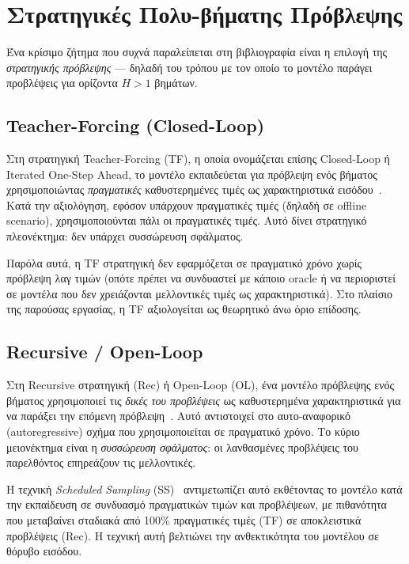 \section{Στρατηγικές Πολυ-βήματης Πρόβλεψης}
\label{sec:forecasting_strategies}

Ένα κρίσιμο ζήτημα που συχνά παραλείπεται στη βιβλιογραφία είναι η επιλογή της \textit{στρατηγικής
πρόβλεψης} --- δηλαδή του τρόπου με τον οποίο το μοντέλο παράγει προβλέψεις για ορίζοντα $H > 1$
βημάτων.

\subsection{Teacher-Forcing (Closed-Loop)}

Στη στρατηγική Teacher-Forcing (TF), η οποία ονομάζεται επίσης Closed-Loop ή Iterated One-Step
Ahead, το μοντέλο εκπαιδεύεται για πρόβλεψη ενός βήματος χρησιμοποιώντας \textit{πραγματικές}
καθυστερημένες τιμές ως χαρακτηριστικά εισόδου~\cite{bontempi2012strategies}. Κατά την αξιολόγηση,
εφόσον υπάρχουν πραγματικές τιμές (δηλαδή σε offline scenario), χρησιμοποιούνται πάλι οι
πραγματικές τιμές. Αυτό δίνει στρατηγικό πλεονέκτημα: δεν υπάρχει συσσώρευση σφάλματος.

Παρόλα αυτά, η TF στρατηγική δεν εφαρμόζεται σε πραγματικό χρόνο χωρίς πρόβλεψη λαγ τιμών (οπότε
πρέπει να συνδυαστεί με κάποιο oracle ή να περιοριστεί σε μοντέλα που δεν χρειάζονται μελλοντικές
τιμές ως χαρακτηριστικά). Στο πλαίσιο της παρούσας εργασίας, η TF αξιολογείται ως θεωρητικό άνω
όριο επίδοσης.

\subsection{Recursive / Open-Loop}

Στη Recursive στρατηγική (Rec) ή Open-Loop (OL), ένα μοντέλο πρόβλεψης ενός βήματος χρησιμοποιεί
τις \textit{δικές του προβλέψεις} ως καθυστερημένα χαρακτηριστικά για να παράξει την επόμενη
πρόβλεψη~\cite{taieb2012review}. Αυτό αντιστοιχεί στο αυτο-αναφορικό (autoregressive) σχήμα που
χρησιμοποιείται σε πραγματικό χρόνο. Το κύριο μειονέκτημα είναι η \textit{συσσώρευση σφάλματος}:
οι λανθασμένες προβλέψεις του παρελθόντος επηρεάζουν τις μελλοντικές.

Η τεχνική \textit{Scheduled Sampling} (SS)~\cite{bengio2015scheduled} αντιμετωπίζει αυτό
εκθέτοντας το μοντέλο κατά την εκπαίδευση σε συνδυασμό πραγματικών τιμών και προβλέψεων, με
πιθανότητα που μεταβαίνει σταδιακά από 100\% πραγματικές τιμές (TF) σε αποκλειστικά προβλέψεις (Rec).
Η τεχνική αυτή βελτιώνει την ανθεκτικότητα του μοντέλου σε θόρυβο εισόδου.


